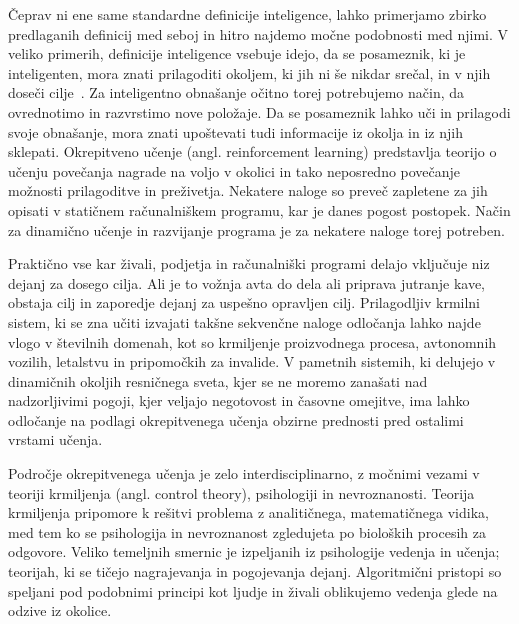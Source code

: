 \documentclass[a4paper, oneside, 12pt]{report}
\begin{document}
Čeprav ni ene same standardne definicije inteligence, lahko primerjamo zbirko predlaganih definicij med seboj in hitro najdemo močne podobnosti med njimi. V veliko primerih, definicije inteligence vsebuje idejo, da se posameznik, ki je inteligenten, mora znati prilagoditi okoljem, ki jih ni še nikdar srečal, in v njih doseči cilje~\cite{ACollectionOfDefinitionsOfIntelligence}. Za inteligentno obnašanje očitno torej potrebujemo način, da ovrednotimo in razvrstimo nove položaje. Da se posameznik lahko uči in prilagodi svoje obnašanje, mora znati upoštevati tudi informacije iz okolja in iz njih sklepati. Okrepitveno učenje (angl. reinforcement learning) predstavlja teorijo o učenju povečanja nagrade na voljo v okolici in tako neposredno povečanje možnosti prilagoditve in preživetja. Nekatere naloge so preveč zapletene za jih opisati v statičnem računalniškem programu, kar je danes pogost postopek. Način za dinamično učenje in razvijanje programa je za nekatere naloge torej potreben.

Praktično vse kar živali, podjetja in računalniški programi delajo vključuje niz dejanj za dosego cilja. Ali je to vožnja avta do dela ali priprava jutranje kave, obstaja cilj in zaporedje dejanj za uspešno opravljen cilj. Prilagodljiv krmilni sistem, ki se zna učiti izvajati takšne sekvenčne naloge odločanja lahko najde vlogo v številnih domenah, kot so krmiljenje proizvodnega procesa, avtonomnih vozilih, letalstvu in pripomočkih za invalide. V pametnih sistemih, ki delujejo v dinamičnih okoljih resničnega sveta, kjer se ne moremo zanašati nad nadzorljivimi pogoji, kjer veljajo negotovost in časovne omejitve, ima lahko odločanje na podlagi okrepitvenega učenja obzirne prednosti pred ostalimi vrstami učenja.

Področje okrepitvenega učenja je zelo interdisciplinarno, z močnimi vezami v teoriji krmiljenja (angl. control theory), psihologiji in nevroznanosti. Teorija krmiljenja pripomore k rešitvi problema z analitičnega, matematičnega vidika, med tem ko se psihologija in nevroznanost zgledujeta po bioloških procesih za odgovore. Veliko temeljnih smernic je izpeljanih iz psihologije vedenja in učenja; teorijah, ki se tičejo nagrajevanja in pogojevanja dejanj. Algoritmični pristopi so speljani pod podobnimi principi kot ljudje in živali oblikujemo vedenja glede na odzive iz okolice.
\end{document}
